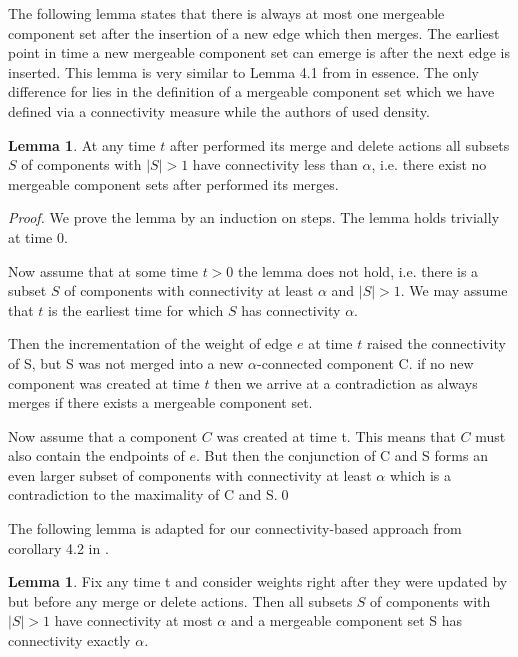 \documentclass[a4paper,xcolor=dvipsnames, tikz, 12pt]{article}
\newcommand{\nl}{\newline}
\newcommand{\crep}{\text{C{\scriptsize REP}}}
\theoremstyle{definition}
\newtheorem{lemma}[defi]{Lemma}
\begin{document}
The following lemma states that there is always at most one mergeable component set after the insertion of a new edge which \crep{} then merges. The earliest point in time a new mergeable component set can emerge is after the next edge is inserted. This lemma is very similar to Lemma 4.1 from \cite{Avin2015} in essence. The only difference for \crep{} lies in the definition of a mergeable component set which we have defined via a connectivity measure while the authors of \cite{Avin2015} used density.

\begin{lemma}
	\label{mergeableLemma}
	At any time $t$ after \crep{} performed its merge and delete actions all subsets $S$ of components with $|S|>1$ have connectivity less than $\alpha$, i.e. there exist no mergeable component sets after \crep{} performed its merges.
\end{lemma}

\textit{Proof.} We prove the lemma by an induction on steps. The lemma holds trivially at time 0.

Now assume that at some time $t>0$ the lemma does not hold, i.e. there is a subset $S$ of components with connectivity at least $\alpha$ and $|S|>1$. We may assume that $t$ is the earliest time for which $S$ has connectivity $\alpha$.

Then the incrementation of the weight of edge $e$ at time $t$ raised the connectivity of S, but S was not merged into a new $\alpha$-connected component C. if no new component was created at time $t$ then we arrive at a contradiction as \crep{} always merges if there exists a mergeable component set.

Now assume that a component $C$ was created at time t. This means that $C$ must also contain the endpoints of $e$. But then the conjunction of C and S forms an even larger subset of components with connectivity at least $\alpha$ which is a contradiction to the maximality of C and S.\qed\nl

The following lemma is adapted for our connectivity-based approach from corollary 4.2 in \cite{Avin2015}.

\begin{lemma}
	\label{mergeable_lemma}
	Fix any time t and consider weights right after they were updated by \crep{} but before any merge or delete actions. Then all subsets $S$ of components with $|S|>1$ have connectivity at most $\alpha$ and a mergeable component set S has connectivity exactly $\alpha$.
\end{lemma}
\end{document}
